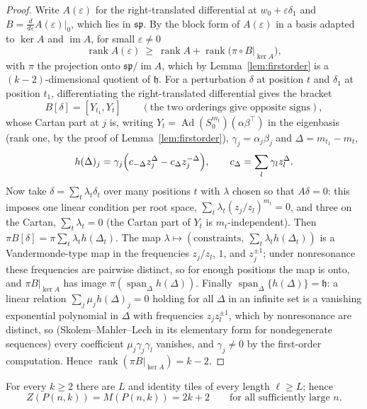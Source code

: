 \begin{proof}
Write $A(\varepsilon)$ for the right-translated differential at
$w_0+\varepsilon\delta_1$ and $B=\frac{d}{d\varepsilon}A(\varepsilon)|_{0}$,
which lies in $\mathfrak{sp}$. By the block form of $A(\varepsilon)$ in a basis
adapted to $\ker A$ and $\operatorname{im}A$, for small $\varepsilon\ne0$
\[
  \operatorname{rank}A(\varepsilon)\ \ge\ \operatorname{rank}A+\operatorname{rank}\bigl(\pi\circ B|_{\ker A}\bigr),
\]
with $\pi$ the projection onto $\mathfrak{sp}/\operatorname{im}A$, which by
Lemma~\ref{lem:firstorder} is a $(k-2)$-dimensional quotient of $\mathfrak h$.
For a perturbation $\delta$ at position $t$ and $\delta_1$ at position $t_1$,
differentiating the right-translated differential gives the bracket
\[
  B[\delta]=[Y_{t_1},Y_t]\qquad(\text{the two orderings give opposite signs}),
\]
whose Cartan part at $j$ is, writing $Y_t=\operatorname{Ad}(S_0^{m_t})(\alpha\beta^{\!\top})$
in the eigenbasis (rank one, by the proof of Lemma~\ref{lem:firstorder}),
$\gamma_j=\alpha_j\beta_j$ and $\Delta=m_{t_1}-m_t$,
\[
  h(\Delta)_j=\gamma_j\Bigl(c_{-\Delta}z_j^{\Delta}-c_{\Delta}z_j^{-\Delta}\Bigr),
  \qquad c_\Delta=\sum_l\gamma_lz_l^{\Delta}.
\]
Now take $\delta=\sum_t\lambda_t\delta_t$ over many positions $t$ with
$\lambda$ chosen so that $A\delta=0$: this imposes one linear condition per root
space, $\sum_t\lambda_t(z_j/z_l)^{m_t}=0$, and three on the Cartan,
$\sum_t\lambda_t=0$ (the Cartan part of $Y_t$ is $m_t$-independent). Then
$\pi B[\delta]=\pi\sum_t\lambda_th(\Delta_t)$. The map
$\lambda\mapsto(\text{constraints},\ \sum_t\lambda_th(\Delta_t))$ is a
Vandermonde-type map in the frequencies $z_j/z_l$, $1$, and $z_j^{\pm1}$; under
nonresonance these frequencies are pairwise distinct, so for enough positions
the map is onto, and $\pi B|_{\ker A}$ has image $\pi(\operatorname{span}_\Delta h(\Delta))$.
Finally $\operatorname{span}_\Delta\{h(\Delta)\}=\mathfrak h$: a linear relation
$\sum_j\mu_jh(\Delta)_j=0$ holding for all $\Delta$ in an infinite set is a
vanishing exponential polynomial in $\Delta$ with frequencies $z_jz_l^{\pm1}$,
which by nonresonance are distinct, so (Skolem--Mahler--Lech in its elementary
form for nondegenerate sequences) every coefficient $\mu_j\gamma_j\gamma_l$
vanishes, and $\gamma_j\ne0$ by the first-order computation. Hence
$\operatorname{rank}(\pi B|_{\ker A})=k-2$.
\end{proof}

\begin{theorem}[All $k$]\label{thm:allkranks}
For every $k\ge2$ there are $L$ and identity tiles of every length $\ell\ge L$;
hence
\[
  Z(P(n,k))=M(P(n,k))=2k+2\qquad\text{for all sufficiently large }n .
\]
\end{theorem}

